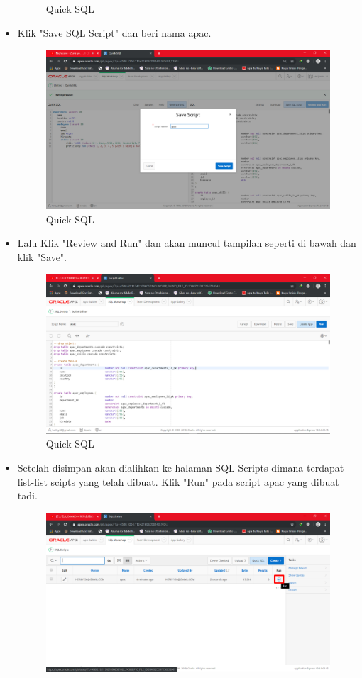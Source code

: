 \documentclass[12pt, times new roman]{article}
\begin{document}
\begin{itemize}
\begin{figure}[!htpb]
	\caption{Quick SQL}
\end{figure}
\item Klik "Save SQL Script" dan beri nama apac.
\begin{figure}[!htpb]
	\centering
	\includegraphics[width=12.5cm]{figures/Screenshot_17.png}
	\caption{Quick SQL}
\end{figure}
\item Lalu Klik "Review and Run" dan akan muncul tampilan seperti di bawah dan klik "Save".
\begin{figure}[!htpb]
	\centering
	\includegraphics[width=12.5cm]{figures/Screenshot_18.png}
	\caption{Quick SQL}
\end{figure}
\item Setelah disimpan akan dialihkan ke halaman SQL Scripts dimana terdapat list-list scipts yang telah dibuat. Klik "Run" pada script apac yang dibuat tadi.
\begin{figure}[!htpb]
	\centering
	\includegraphics[width=12cm]{figures/Screenshot_19.png}

\end{figure}
\end{itemize}
\end{document}
